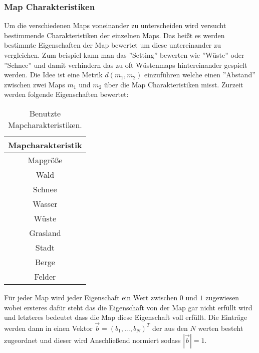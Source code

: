         \subsubsection{Map Charakteristiken}
            Um die verschiedenen Maps voneinander zu unterscheiden wird versucht bestimmende Charakteristiken der einzelnen Maps.
            Das heißt es werden bestimmte Eigenschaften der Map bewertet um diese untereinander zu vergleichen.
            Zum beispiel kann man das ''Setting'' bewerten wie ''Wüste'' oder ''Schnee'' und damit verhindern das zu oft Wüstenmaps hintereinander gespielt werden.
            Die Idee ist eine Metrik $d(m_1,m_2)$ einzuführen welche einen ''Abstand'' zwischen zwei Maps $m_1$ und $m_2$ über die Map Charakteristiken misst.
            Zurzeit werden folgende Eigenschaften bewertet:
            \begin{table}[h]
                \centering
                \begin{tabular}{|| c ||}
                    \hline
                    \textbf{Mapcharakteristik}  \\
                    \hline
                    \hline
                    Mapgröße \\
                    \hline
                    Wald \\
                    \hline
                    Schnee \\
                    \hline
                    Wasser \\
                    \hline
                    Wüste \\
                    \hline
                    Grasland \\
                    \hline
                    Stadt \\
                    \hline
                    Berge \\
                    \hline
                    Felder \\
                    \hline
                \end{tabular}
                \caption{Benutzte Mapcharakteristiken.}
                \label{t:Aufbau:Charakteristiken}
            \end{table}
            Für jeder Map wird jeder Eigenschaft ein Wert zwischen $0$ und $1$ zugewiesen wobei ersteres dafür steht das die Eigenschaft von der Map gar nicht erfüllt wird und letzteres bedeutet dass die Map diese Eigenschaft voll erfüllt. 
            Die Einträge werden dann in einen Vektor $\vec{b}=(b_1,...,b_N)^T$ der aus den $N$ werten besteht zugeordnet und dieser wird Anschließend normiert sodass $|\vec{b}|=1$.
